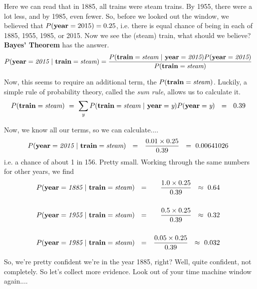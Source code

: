 \documentclass[a4paper,10pt]{article}
\begin{document}
Here we can read that in 1885, all trains were steam trains.  By 1955, there were a lot less, and by 1985, even fewer.
So, before we looked out the window, we believed that $P({\bf year}=2015)=0.25$, i.e. there is equal chance of
being in each of 1885, 1955, 1985, or 2015. Now we see the (steam) train, what should we believe?  {\bf Bayes' Theorem} has the answer.
\begin{eqnarray*}
P({\bf year}=\textit{2015}~|~{\bf train}=\textit{steam})= \frac{P({\bf train}=\textit{steam}~|~{\bf year}=\textit{2015})  P({\bf year}=\textit{2015})}
{P({\bf train}=\textit{steam})}
\end{eqnarray*}

\noindent Now, this seems to require an additional term, the $P({\bf train}=\textit{steam})$.  Luckily, a simple rule of probability theory, called the {\em sum rule}, allows us to calculate it.
\begin{eqnarray*}
P({\bf train}=\textit{steam})~=~\sum_{y} P({\bf train}=\textit{steam}~|~{\bf year}=\textit{y}) P({\bf year}=\textit{y})~~=~~0.39
\end{eqnarray*}

\noindent Now, we know all our terms, so we can calculate....
\begin{eqnarray*}
P({\bf year}=\textit{2015}~|~{\bf train}=\textit{steam})~~&=& \frac{0.01\times 0.25}{0.39}~~=~0.00641026
\end{eqnarray*}
i.e. a chance of about 1 in 156. Pretty small. Working through the same numbers for other years, we find\\
\begin{eqnarray*}
P({\bf year}=\textit{1885}~|~{\bf train}=\textit{steam})~~&=& \frac{1.0\times 0.25}{0.39}~~\approx~0.64\\~\\
P({\bf year}=\textit{1955}~|~{\bf train}=\textit{steam})~~&=& \frac{0.5\times 0.25}{0.39}~~\approx~0.32\\~\\
P({\bf year}=\textit{1985}~|~{\bf train}=\textit{steam})~~&=& \frac{0.05\times 0.25}{0.39}~~\approx~0.032\\
\end{eqnarray*}

\noindent So, we're pretty confident we're in the year 1885, right? Well, quite confident, not completely. So let's collect more evidence. Look out of your time machine window again....\\
\end{document}
